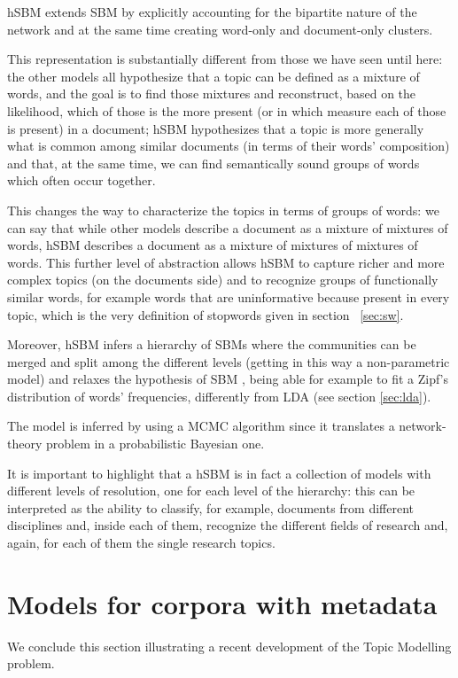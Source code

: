 \documentclass[11pt, a4paper, oneside, openright]{book}
\begin{document}
hSBM extends SBM by explicitly accounting for the bipartite nature of the network and at the same time creating word-only and document-only clusters. 

This representation is substantially different from those we have seen until here: the other models all hypothesize that a topic can be defined as a mixture of words, and the goal is to find those mixtures and reconstruct, based on the likelihood, which of those is the more present (or in which measure each of those is present) in a document; hSBM hypothesizes that a topic is more generally what is common among similar documents (in terms of their words' composition) and that, at the same time, we can find semantically sound groups of words which often occur together.

This changes the way to characterize the topics in terms of groups of words: we can say that while other models describe a document as a mixture of mixtures of words, hSBM describes a document as a mixture of mixtures of mixtures of words. This further level of abstraction allows hSBM to capture richer and more complex topics (on the documents side) and to recognize groups of functionally similar words, for example words that are uninformative because present in every topic, which is the very definition of stopwords given in section ~\ref{sec:sw}.

Moreover, hSBM infers a hierarchy of SBMs where the communities can be merged and split among the different levels \parencite{peixoto2019} (getting in this way a non-parametric model) and relaxes the hypothesis of SBM \parencite{gerlach2018}, being able for example to fit a Zipf's distribution of words' frequencies, differently from LDA (see section \ref{sec:lda}).

The model is inferred by using a MCMC algorithm since it translates a network-theory problem in a probabilistic Bayesian one.

It is important to highlight that a hSBM is in fact a collection of models with different levels of resolution, one for each level of the hierarchy: this can be interpreted as the ability to classify, for example, documents from different disciplines and, inside each of them, recognize the different fields of research and, again, for each of them the single research topics.

\chapter{Models for corpora with metadata}
We conclude this section illustrating a recent development of the Topic Modelling problem.
\end{document}
